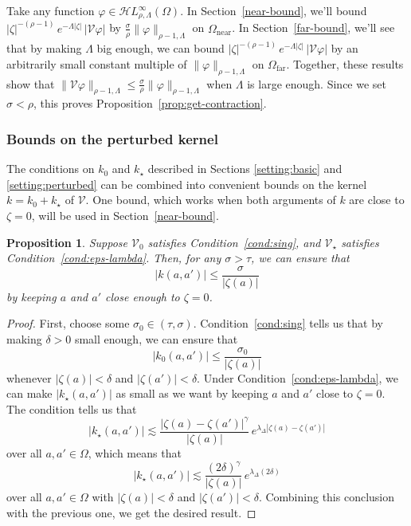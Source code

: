 \documentclass{article}
\theoremstyle{plain}
\newtheorem{prop}{Proposition}
\newcommand{\singexp}[2]{\mathcal{H}L^\infty_{#1, #2}}
\newcommand{\volterra}{\mathcal{V}}
\newcommand{\hardpart}{\mathcal{V}_0}
\newcommand{\softpart}{\mathcal{V}_\star}
\newcommand{\kerwhole}{k}
\newcommand{\hardker}{k_0}
\newcommand{\softker}{k_\star}
\newcommand{\domain}{\Omega}
\newcommand{\near}{\Omega_\text{near}}
\newcommand{\far}{\Omega_\text{far}}
\begin{document}
Take any function $\varphi \in \singexp{\rho}{\Lambda}(\domain)$. In Section~\ref{near-bound}, we'll bound $|\zeta|^{-(\rho-1)}\,e^{-\Lambda|\zeta|}\,|\volterra\varphi|$ by $\tfrac{\sigma}{\rho} \|\varphi\|_{\rho-1, \Lambda}$ on $\near$. In Section~\ref{far-bound}, we'll see that by making $\Lambda$ big enough, we can bound $|\zeta|^{-(\rho-1)}\,e^{-\Lambda|\zeta|}\,|\volterra\varphi|$ by an arbitrarily small constant multiple of $\|\varphi\|_{\rho-1, \Lambda}$ on $\far$. Together, these results show that $\|\volterra \varphi\|_{\rho-1, \Lambda} \le \tfrac{\sigma}{\rho} \|\varphi\|_{\rho-1, \Lambda}$ when $\Lambda$ is large enough. Since we set $\sigma < \rho$, this proves Proposition~\ref{prop:get-contraction}.
\subsubsection{Bounds on the perturbed kernel}\label{sec:bounds on k}
The conditions on $\hardker$ and $\softker$ described in Sections \ref{setting:basic} and \ref{setting:perturbed} can be combined into convenient bounds on the kernel $\kerwhole = \hardker + \softker$ of $\volterra$. One bound, which works when both arguments of $\kerwhole$ are close to $\zeta = 0$, will be used in Section~\ref{near-bound}.
\begin{prop}\label{prop:whole-ker-near-bound}
Suppose $\hardpart$ satisfies Condition~\eqref{cond:sing}, and $\softpart$ satisfies Condition~\eqref{cond:eps-lambda}. Then, for any $\sigma > \tau$, we can ensure that
\[ |\kerwhole(a, a')| \le \frac{\sigma}{|\zeta(a)|} \]
by keeping $a$ and $a'$ close enough to $\zeta = 0$.
\end{prop}
\begin{proof}
First, choose some $\sigma_0 \in (\tau, \sigma)$. Condition~\eqref{cond:sing} tells us that by making $\delta > 0$ small enough, we can ensure that
\[ |\hardker(a, a')| \le \frac{\sigma_0}{|\zeta(a)|} \]
whenever $|\zeta(a)| < \delta$ and $|\zeta(a')| < \delta$. Under Condition~\eqref{cond:eps-lambda}, we can make $|\softker(a, a')|$ as small as we want by keeping $a$ and $a'$ close to $\zeta = 0$. The condition tells us that
\[ \big| \softker(a, a') \big| \lesssim\frac{|\zeta(a)-\zeta(a')|^\gamma}{|\zeta(a)|}\,e^{\lambda_\Delta|\zeta(a)-\zeta(a')|}\]
over all $a, a' \in \domain$, which means that
\[ \big| \softker(a, a') \big| \lesssim\frac{(2\delta)^\gamma}{|\zeta(a)|}\,e^{\lambda_\Delta(2\delta)}\]
over all $a, a' \in \domain$ with $|\zeta(a)| < \delta$ and $|\zeta(a')| < \delta$. Combining this conclusion with the previous one, we get the desired result.
\end{proof}
\end{document}
